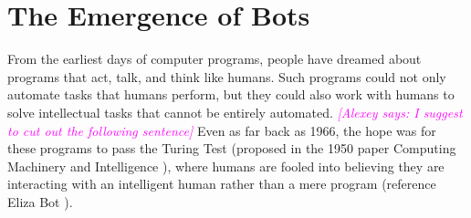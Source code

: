 \documentclass{sig-alternate}
\newcommand{\az}[1]{\textcolor{magenta}{{\it [Alexey says: #1]}}}
\begin{document}
%
\author{
% 
%
\alignauthor
XXX\\
       \\
}

\date{29 Sept 2017}

\maketitle
%




\section{The Emergence of Bots} 


From the earliest days of computer programs, people have dreamed about programs that act, talk, and think like humans.
Such programs could not only automate tasks that humans perform, but they could also work with humans to solve intellectual tasks that cannot be entirely automated. 
\az{I suggest to cut out the following sentence}
Even as far back as 1966, the hope was for these programs to pass the Turing Test (proposed in the 1950 paper Computing Machinery and Intelligence \cite{Turing-1950}), where humans are fooled into believing they are interacting with an intelligent human rather than a mere program (reference Eliza Bot \cite{Weizenbaum:1966:ECP:365153.365168}). 
\end{document}
